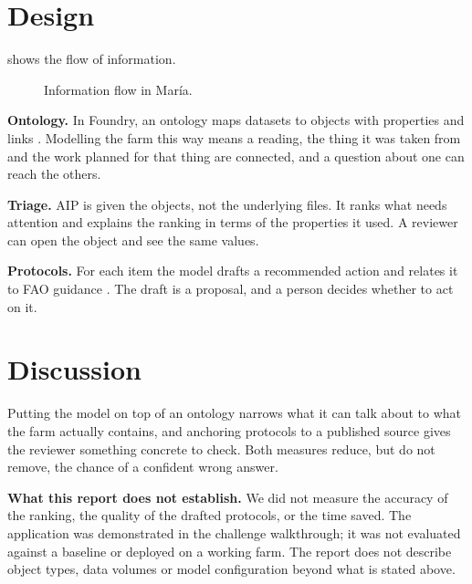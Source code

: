 \documentclass[11pt,letterpaper]{article}
\begin{document}
\section{Design}\label{sec:design}
 shows the flow of information.
\begin{figure}[t]\centering
{}
\caption{Information flow in Mar\'ia.}\label{fig:flow}
\end{figure}

\textbf{Ontology.} In Foundry, an ontology maps datasets to objects with properties and links \citep{palantirdocs}. Modelling the farm this way means a reading, the thing it was taken from and the work planned for that thing are connected, and a question about one can reach the others.

\textbf{Triage.} AIP is given the objects, not the underlying files. It ranks what needs attention and explains the ranking in terms of the properties it used. A reviewer can open the object and see the same values.

\textbf{Protocols.} For each item the model drafts a recommended action and relates it to FAO guidance \citep{faogap}. The draft is a proposal, and a person decides whether to act on it.

\section{Discussion}\label{sec:discussion}
Putting the model on top of an ontology narrows what it can talk about to what the farm actually contains, and anchoring protocols to a published source gives the reviewer something concrete to check. Both measures reduce, but do not remove, the chance of a confident wrong answer.

\textbf{What this report does not establish.} We did not measure the accuracy of the ranking, the quality of the drafted protocols, or the time saved. The application was demonstrated in the challenge walkthrough; it was not evaluated against a baseline or deployed on a working farm. The report does not describe object types, data volumes or model configuration beyond what is stated above.
\end{document}
